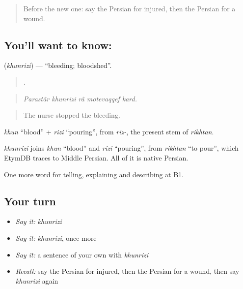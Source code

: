 \label{lesson:FA-C326-khunrizi}



\begin{quote}
Before the new one: say the Persian for injured, then the Persian for a wound.
\end{quote}

\subsection*{You'll want to know: }
\textbf{} (\emph{khunrizi}) — \textquotedblleft{}bleeding; bloodshed\textquotedblright{}.

\begin{quote}
    .
\end{quote}

\begin{quote}
\emph{Parastâr khunrizi râ motevaqqef kard.}
\end{quote}

\begin{quote}
The nurse stopped the bleeding.
\end{quote}

\emph{khun} \textquotedblleft{}blood\textquotedblright{} + \emph{rizi} \textquotedblleft{}pouring\textquotedblright{}, from \emph{riz-}, the present stem of \emph{rikhtan}.

\begin{cousinweb}
\emph{khunrizi} joins \emph{khun} \textquotedblleft{}blood\textquotedblright{} and \emph{rizi} \textquotedblleft{}pouring\textquotedblright{}, from \emph{rikhtan} \textquotedblleft{}to pour\textquotedblright{}, which EtymDB traces to Middle Persian. All of it is native Persian.
\end{cousinweb}

\begin{grammarlens}[title={What you've built}]
One more word for telling, explaining and describing at B1.
\end{grammarlens}

\subsection*{Your turn}
\begin{itemize}
\raggedright
  \item \emph{Say it:} \emph{khunrizi}
  \item \emph{Say it:} \emph{khunrizi}, once more
  \item \emph{Say it:} a sentence of your own with \emph{khunrizi}
  \item \emph{Recall:} say the Persian for injured, then the Persian for a wound, then say \emph{khunrizi} again
\end{itemize}

